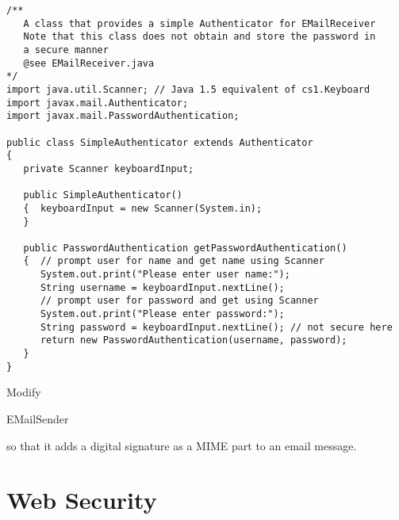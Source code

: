 \begin{figure*}\begin{program}\begin{verbatim}
/**
   A class that provides a simple Authenticator for EMailReceiver
   Note that this class does not obtain and store the password in
   a secure manner
   @see EMailReceiver.java
*/
import java.util.Scanner; // Java 1.5 equivalent of cs1.Keyboard
import javax.mail.Authenticator;
import javax.mail.PasswordAuthentication;

public class SimpleAuthenticator extends Authenticator
{
   private Scanner keyboardInput;

   public SimpleAuthenticator()
   {  keyboardInput = new Scanner(System.in);
   }

   public PasswordAuthentication getPasswordAuthentication()
   {  // prompt user for name and get name using Scanner
      System.out.print("Please enter user name:");
      String username = keyboardInput.nextLine();
      // prompt user for password and get using Scanner
      System.out.print("Please enter password:");
      String password = keyboardInput.nextLine(); // not secure here
      return new PasswordAuthentication(username, password);
   }
}
\end{verbatim}\end{program}\end{figure*}

\begin{exercise}
Modify \begin{code}EMailSender\end{code} so that it adds
a digital signature as a MIME part to an email message.
\end{exercise}


\clearpage
\section{Web Security}\label{Se:WebSecurity}


